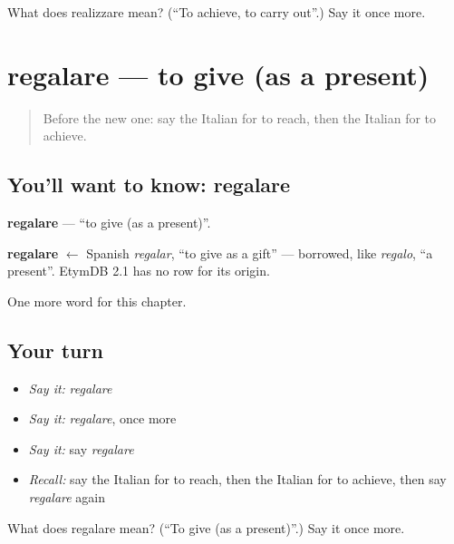 \begin{tcolorbox}[breakable,colback=teal!4,colframe=teal!35!black,title={Before you move on}]
What does realizzare mean? (\textquotedblleft{}To achieve, to carry out\textquotedblright{}.) Say it once more.
\end{tcolorbox}
\section[regalare]{regalare — to give (as a present)}

\label{lesson:IT-C239-regalare}



\begin{quote}
Before the new one: say the Italian for to reach, then the Italian for to achieve.
\end{quote}

\subsection*{You'll want to know: regalare}
\textbf{regalare} — \textquotedblleft{}to give (as a present)\textquotedblright{}.

\begin{cousinweb}
\textbf{regalare} $\leftarrow$ Spanish \emph{regalar}, \textquotedblleft{}to give as a gift\textquotedblright{} — borrowed, like \emph{regalo}, \textquotedblleft{}a present\textquotedblright{}. EtymDB 2.1 has no row for its origin.
\end{cousinweb}

\begin{grammarlens}[title={What you've built}]
One more word for this chapter.
\end{grammarlens}

\subsection*{Your turn}
\begin{itemize}
\raggedright
  \item \emph{Say it:} \emph{regalare}
  \item \emph{Say it:} \emph{regalare}, once more
  \item \emph{Say it:} say \emph{regalare}
  \item \emph{Recall:} say the Italian for to reach, then the Italian for to achieve, then say \emph{regalare} again
\end{itemize}

\begin{tcolorbox}[breakable,colback=teal!4,colframe=teal!35!black,title={Before you move on}]
What does regalare mean? (\textquotedblleft{}To give (as a present)\textquotedblright{}.) Say it once more.
\end{tcolorbox}
